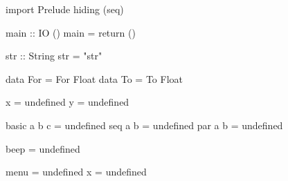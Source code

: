 \begin{code}
import Prelude hiding (seq)

main :: IO ()
main = return ()

str :: String
str = "str"

data For = For Float
data To = To Float

x = undefined
y = undefined

basic a b c = undefined
seq a b = undefined
par a b = undefined

beep = undefined

menu = undefined
x = undefined
\end{code}

